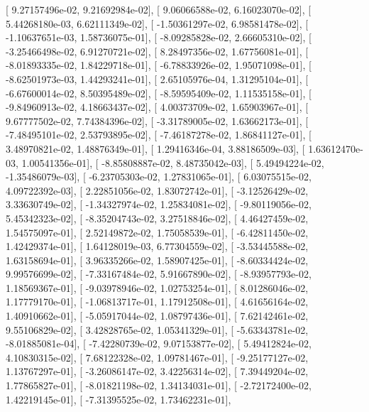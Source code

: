 \documentclass{article}
\begin{document}
       [  9.27157496e-02,   9.21692984e-02],
       [  9.06066588e-02,   6.16023070e-02],
       [  5.44268180e-03,   6.62111349e-02],
       [ -1.50361297e-02,   6.98581478e-02],
       [ -1.10637651e-03,   1.58736075e-01],
       [ -8.09285828e-02,   2.66605310e-02],
       [ -3.25466498e-02,   6.91270721e-02],
       [  8.28497356e-02,   1.67756081e-01],
       [ -8.01893335e-02,   1.84229718e-01],
       [ -6.78833926e-02,   1.95071098e-01],
       [ -8.62501973e-03,   1.44293241e-01],
       [  2.65105976e-04,   1.31295104e-01],
       [ -6.67600014e-02,   8.50395489e-02],
       [ -8.59595409e-02,   1.11535158e-01],
       [ -9.84960913e-02,   4.18663437e-02],
       [  4.00373709e-02,   1.65903967e-01],
       [  9.67777502e-02,   7.74384396e-02],
       [ -3.31789005e-02,   1.63662173e-01],
       [ -7.48495101e-02,   2.53793895e-02],
       [ -7.46187278e-02,   1.86841127e-01],
       [  3.48970821e-02,   1.48876349e-01],
       [  1.29416346e-04,   3.88186509e-03],
       [  1.63612470e-03,   1.00541356e-01],
       [ -8.85808887e-02,   8.48735042e-03],
       [  5.49494224e-02,  -1.35486079e-03],
       [ -6.23705303e-02,   1.27831065e-01],
       [  6.03075515e-02,   4.09722392e-03],
       [  2.22851056e-02,   1.83072742e-01],
       [ -3.12526429e-02,   3.33630749e-02],
       [ -1.34327974e-02,   1.25834081e-02],
       [ -9.80119056e-02,   5.45342323e-02],
       [ -8.35204743e-02,   3.27518846e-02],
       [  4.46427459e-02,   1.54575097e-01],
       [  2.52149872e-02,   1.75058539e-01],
       [ -6.42811450e-02,   1.42429374e-01],
       [  1.64128019e-03,   6.77304559e-02],
       [ -3.53445588e-02,   1.63158694e-01],
       [  3.96335266e-02,   1.58907425e-01],
       [ -8.60334424e-02,   9.99576699e-02],
       [ -7.33167484e-02,   5.91667890e-02],
       [ -8.93957793e-02,   1.18569367e-01],
       [ -9.03978946e-02,   1.02753254e-01],
       [  8.01286046e-02,   1.17779170e-01],
       [ -1.06813717e-01,   1.17912508e-01],
       [  4.61656164e-02,   1.40910662e-01],
       [ -5.05917044e-02,   1.08797436e-01],
       [  7.62142461e-02,   9.55106829e-02],
       [  3.42828765e-02,   1.05341329e-01],
       [ -5.63343781e-02,  -8.01885081e-04],
       [ -7.42280739e-02,   9.07153877e-02],
       [  5.49412824e-02,   4.10830315e-02],
       [  7.68122328e-02,   1.09781467e-01],
       [ -9.25177127e-02,   1.13767297e-01],
       [ -3.26086147e-02,   3.42256314e-02],
       [  7.39449204e-02,   1.77865827e-01],
       [ -8.01821198e-02,   1.34134031e-01],
       [ -2.72172400e-02,   1.42219145e-01],
       [ -7.31395525e-02,   1.73462231e-01],
\end{document}
